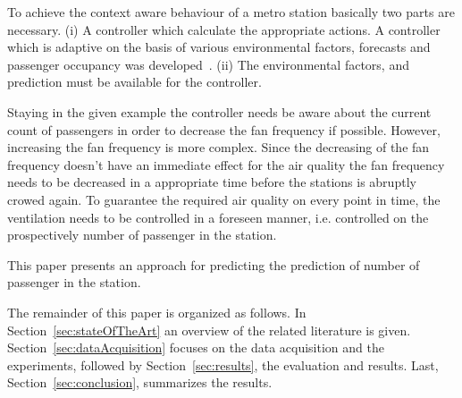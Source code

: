 To achieve the context aware behaviour of a metro station basically two parts are necessary. (i) A controller which calculate the appropriate actions. A controller which is adaptive on the basis of various environmental factors, forecasts and passenger occupancy was developed~\cite{guo_intelligent_2013}.
(ii) The environmental factors, and prediction must be available for the controller. 

Staying in the given example the controller needs be aware about the current count of passengers in order to decrease the fan frequency if possible. However, increasing the fan frequency is more complex. Since the decreasing of the fan frequency doesn't have an immediate effect for the air quality the fan frequency needs to be decreased in a appropriate time before the stations is abruptly crowed again. To guarantee the required air quality on every point in time, the ventilation needs to be controlled in a foreseen manner, i.e. controlled on the prospectively number of passenger in the station.

This paper presents an approach for predicting the prediction of number of passenger in the station.

The remainder of this paper is organized as follows. In Section~\ref{sec:stateOfTheArt} an overview of the related literature is given. Section~\ref{sec:dataAcquisition} focuses on the data acquisition and the experiments, followed by Section~\ref{sec:results}, the evaluation and results. Last, Section~\ref{sec:conclusion}, summarizes the results.

